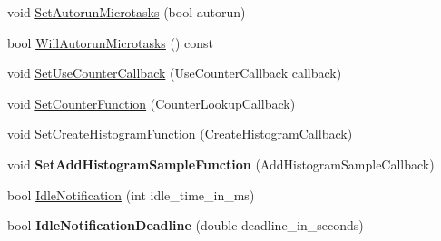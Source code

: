 \begin{DoxyCompactItemize}
$$\item 
void \hyperlink{classv8_1_1_isolate_a6c046eb1d5ab19ef11c18c2f6e775df1}{Set\+Autorun\+Microtasks} (bool autorun)
\item 
bool \hyperlink{classv8_1_1_isolate_ae70ee311ab3271f9fbb043749d5be8c0}{Will\+Autorun\+Microtasks} () const 
\item 
void \hyperlink{classv8_1_1_isolate_ad608b24b2c1b49a97ed4f04500976166}{Set\+Use\+Counter\+Callback} (Use\+Counter\+Callback callback)
\item 
void \hyperlink{classv8_1_1_isolate_ab59a904591d417ebb3889b5fa507447b}{Set\+Counter\+Function} (Counter\+Lookup\+Callback)
\item 
void \hyperlink{classv8_1_1_isolate_afd624c7e429a061c1cd9e5959ce6ebf0}{Set\+Create\+Histogram\+Function} (Create\+Histogram\+Callback)
\item 
\hypertarget{classv8_1_1_isolate_ae5c813518efe1cfaccd0262ad6ed2f82}{}void {\bfseries Set\+Add\+Histogram\+Sample\+Function} (Add\+Histogram\+Sample\+Callback)\label{classv8_1_1_isolate_ae5c813518efe1cfaccd0262ad6ed2f82}

\item 
bool \hyperlink{classv8_1_1_isolate_aea16cbb2e351de9a3ae7be2b7cb48297}{Idle\+Notification} (int idle\+\_\+time\+\_\+in\+\_\+ms)
\item 
\hypertarget{classv8_1_1_isolate_aba794ed25d4fa8780b3a07c66a5e5d4a}{}bool {\bfseries Idle\+Notification\+Deadline} (double deadline\+\_\+in\+\_\+seconds)\label{classv8_1_1_isolate_aba794ed25d4fa8780b3a07c66a5e5d4a}


\end{DoxyCompactItemize}
